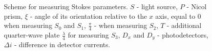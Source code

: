 \begin{figure}
\centering



\caption{Scheme for measuring Stokes parameters. $S$ - light source, $P$
  - Nicol prism, $\xi$ - angle of its orientation relative to the $x$ axis,
  equal to 0 when measuring $S_0$ and $S_1$, $\frac{\pi}{4}$ - when
  measuring $S_2$, $T$ - additional quarter-wave plate
$\frac{\lambda}{4}$ for measuring $S_3$, $D_x$ and $D_y$ -
photodetectors, $\Delta i$ - difference in detector currents.}
\label{figPart3EntangStokes}
\end{figure}